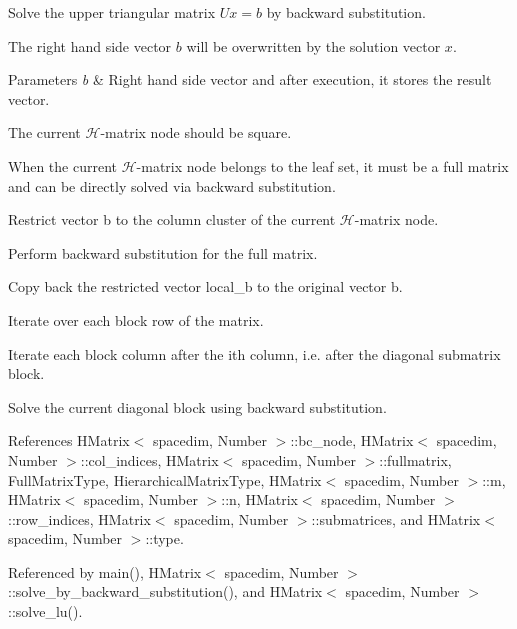 Solve the upper triangular matrix $Ux=b$ by backward substitution.

The right hand side vector $b$ will be overwritten by the solution vector $x$.


\begin{DoxyParams}{Parameters}
{\em b} & Right hand side vector and after execution, it stores the result vector. \\
\hline
\end{DoxyParams}
The current $\mathcal{H}$-\/matrix node should be square.

When the current $\mathcal{H}$-\/matrix node belongs to the leaf set, it must be a full matrix and can be directly solved via backward substitution.

Restrict vector {\ttfamily b} to the column cluster of the current $\mathcal{H}$-\/matrix node.

Perform backward substitution for the full matrix.

Copy back the restricted vector {\ttfamily local\+\_\+b} to the original vector {\ttfamily b}.

Iterate over each block row of the matrix.

Iterate each block column after the i\textquotesingle{}th column, i.\+e. after the diagonal submatrix block.

Solve the current diagonal block using backward substitution.

References H\+Matrix$<$ spacedim, Number $>$\+::bc\+\_\+node, H\+Matrix$<$ spacedim, Number $>$\+::col\+\_\+indices, H\+Matrix$<$ spacedim, Number $>$\+::fullmatrix, Full\+Matrix\+Type, Hierarchical\+Matrix\+Type, H\+Matrix$<$ spacedim, Number $>$\+::m, H\+Matrix$<$ spacedim, Number $>$\+::n, H\+Matrix$<$ spacedim, Number $>$\+::row\+\_\+indices, H\+Matrix$<$ spacedim, Number $>$\+::submatrices, and H\+Matrix$<$ spacedim, Number $>$\+::type.



Referenced by main(), H\+Matrix$<$ spacedim, Number $>$\+::solve\+\_\+by\+\_\+backward\+\_\+substitution(), and H\+Matrix$<$ spacedim, Number $>$\+::solve\+\_\+lu().

\mbox{\label{classHMatrix_ab89582b86090d18d33f7ae04deda1f5f}} 

